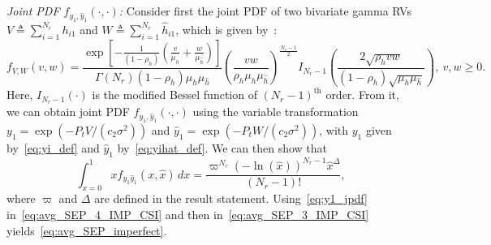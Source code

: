\documentclass[12pt,draftcls,peerreview,onecolumn]{IEEEtran}
\newcommand{\define}{\triangleq}
\newcommand{\muh}{{\mu_{h}}}
\newcommand{\Nr}{{N_r}}
\newcommand{\Pt}{{P_t}}
\newcommand{\such}{h}
\newcommand{\hk}[1]{{\such_{#1}}}
\newcommand{\noisevar}{\sigma^2}
\newcommand{\ctwo}{c_{2}}
\newcommand{\yk}[1]{y_{#1}}
\newcommand{\snr}{\Omega}
\newcommand{\snrhat}{\widehat{\snr}}
\newcommand{\hhat}{\hat{\such}}
\newcommand{\hkhat}[1]{\hhat_{#1}}
\newcommand{\ykhat}[1]{\hat{y}_{#1}}
\newcommand{\muhhat}{\mu_{\hhat}}
\newcommand{\rhoh}{\rho_h}
\newcommand{\T}{\varpi}
\newcommand{\xhat}{\hat{x}}
\newcommand{\sumnr}{\sum_{i=1}^{\Nr}}
\newcommand{\D}{\Delta}
\begin{document}
{\em Joint PDF $f_{\yk{1},\ykhat{1}}\left(\cdot,\cdot\right)$:} Consider first the joint PDF of two bivariate gamma RVs $V\define\sumnr\hk{i1}$ and $W\define\sumnr\hkhat{i1}$, which is given by~\cite[(6.1)]{simon_alouini_book}:
\begin{equation}
\label{eq:bivargammaPDF}
f_{V,W}(v,w) = \frac{\exp\left[{-\frac{1}{(1-\rhoh)}\left( \frac{v}{\muh}+\frac{w}{\muhhat}\right) } \right]}{\Gamma\left(\Nr \right) \left(1-\rhoh \right)\muh\muhhat }\left(\frac{vw}{\rhoh \muh\muhhat}\right)^{\frac{\Nr-1}{2}}  I_{\Nr-1}\left(\frac{2\sqrt{\rhoh vw}}{(1-\rhoh)\sqrt{\muh\muhhat}}\right),~v, w \geq 0.
\end{equation}
%  
Here, $I_{\Nr-1}\left(\cdot \right) $ is the modified Bessel function of $(\Nr-1)^{\text{th}}$ order. From it, we can obtain joint PDF $f_{\yk{1},\ykhat{1}}\left(\cdot,\cdot\right)$ using the variable transformation $\yk{1}=\exp\left(-\Pt V/(\ctwo\noisevar)\right)$ and $\ykhat{1}=\exp\left(-\Pt W/(\ctwo\noisevar) \right)$, with $\yk{1}$ given by~\eqref{eq:yi_def} and $\ykhat{1}$ by~\eqref{eq:yihat_def}.  
%
% 
We can then show that %
\begin{equation}
\label{eq:y1_jpdf}
\int_{x=0}^{1} x f_{\yk{1}\ykhat{1}}\left(x,\xhat\right)\,dx = \frac{\T^{\Nr}\left(-\ln\left({\xhat} \right)\right)^{\Nr-1}\xhat^{\D}}{(\Nr-1)!},
\end{equation}
where $\T$ and $\D$ are defined in the result statement. Using~\eqref{eq:y1_jpdf}  in~\eqref{eq:avg_SEP_4_IMP_CSI} and then in~\eqref{eq:avg_SEP_3_IMP_CSI}  yields~\eqref{eq:avg_SEP_imperfect}.
\end{document}
